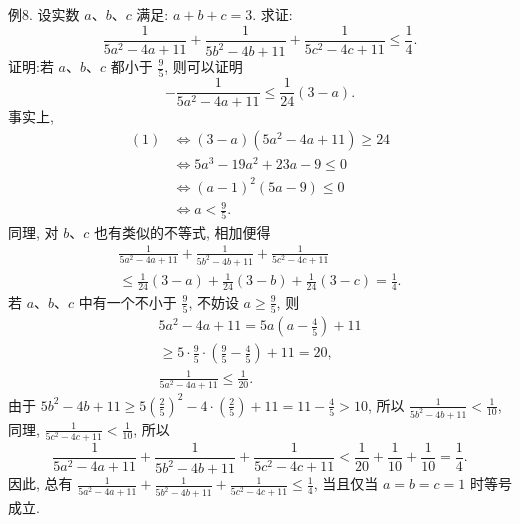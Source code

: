 例8. 设实数 $a 、 b 、 c$ 满足: $a+b+c=3$. 求证:
$$
\frac{1}{5 a^2-4 a+11}+\frac{1}{5 b^2-4 b+11}+\frac{1}{5 c^2-4 c+11} \leqslant \frac{1}{4} .
$$
证明:若 $a 、 b 、 c$ 都小于 $\frac{9}{5}$, 则可以证明
$$
-\frac{1}{5 a^2-4 a+11} \leqslant \frac{1}{24}(3-a) . \label{(1)}
$$
事实上,
$$
\begin{aligned}
(1) & \Leftrightarrow(3-a)\left(5 a^2-4 a+11\right) \geqslant 24 \\
& \Leftrightarrow 5 a^3-19 a^2+23 a-9 \leqslant 0 \\
& \Leftrightarrow(a-1)^2(5 a-9) \leqslant 0 \\
& \Leftrightarrow a<\frac{9}{5} .
\end{aligned}
$$
同理, 对 $b 、 c$ 也有类似的不等式, 相加便得
$$
\begin{gathered}
\frac{1}{5 a^2-4 a+11}+\frac{1}{5 b^2-4 b+11}+\frac{1}{5 c^2-4 c+11} \\
\leqslant \frac{1}{24}(3-a)+\frac{1}{24}(3-b)+\frac{1}{24}(3-c)=\frac{1}{4} .
\end{gathered}
$$
若 $a 、 b 、 c$ 中有一个不小于 $\frac{9}{5}$, 不妨设 $a \geqslant \frac{9}{5}$, 则
$$
\begin{gathered}
5 a^2-4 a+11=5 a\left(a-\frac{4}{5}\right)+11 \\
\geqslant 5 \cdot \frac{9}{5} \cdot\left(\frac{9}{5}-\frac{4}{5}\right)+11=20, \\
\frac{1}{5 a^2-4 a+11} \leqslant \frac{1}{20} .
\end{gathered}
$$
由于 $5 b^2-4 b+11 \geqslant 5\left(\frac{2}{5}\right)^2-4 \cdot\left(\frac{2}{5}\right)+11=11-\frac{4}{5}>10$, 所以 $\frac{1}{5 b^2-4 b+11}<\frac{1}{10}$, 同理, $\frac{1}{5 c^2-4 c+11}<\frac{1}{10}$, 所以
$$
\frac{1}{5 a^2-4 a+11}+\frac{1}{5 b^2-4 b+11}+\frac{1}{5 c^2-4 c+11}<\frac{1}{20}+\frac{1}{10}+\frac{1}{10}=\frac{1}{4} .
$$
因此, 总有 $\frac{1}{5 a^2-4 a+11}+\frac{1}{5 b^2-4 b+11}+\frac{1}{5 c^2-4 c+11} \leqslant \frac{1}{4}$, 当且仅当 $a=b=c=1$ 时等号成立.



